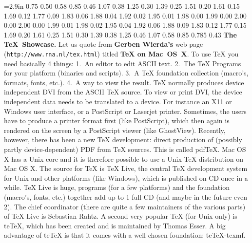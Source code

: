 
\nopagenumbers {}=2.9in \parindent0pt
  0.75   0.50
  0.58   0.85
  0.46   1.07
  0.38   1.25
  0.30   1.39
  0.25   1.51
  0.20   1.61
  0.15   1.69
  0.12   1.77
  0.09   1.83
  0.06   1.88
  0.04   1.92
  0.02   1.95
  0.01   1.98
  0.00   1.99
  0.00   2.00
  0.00   2.00
  0.00   1.99
  0.01   1.98
  0.02   1.95
  0.04   1.92
  0.06   1.88
  0.09   1.83
  0.12   1.77
  0.15   1.69
  0.20   1.61
  0.25   1.51
  0.30   1.39
  0.38   1.25
  0.46   1.07
  0.58   0.85
  0.785   0.43
\baselineskip=12.5pt
\parfillskip=0pt
{\bf The \TeX\ Showcase.}
Let us quote from {\bf Gerben Wierda's} web page
({\tt http://www.rna.nl/tex.html}) titled
{\bf TeX on Mac~OS~X}.
To use TeX you need basically 4 things:
1.~An editor to edit ASCII text. 
2.~The TeX Programs for your platform (binaries and scripts). 
3.~A TeX foundation collection (macro's, formats, fonts, etc.). 
4.~A way to view the result.
%
TeX normally produces device independent DVI from the ASCII TeX source. 
To view or print DVI, the device independent data needs to be translated to a device. For instance an X11 or Windows user interface, or a PostScript or Laserjet printer. Sometimes, the users have to produce a printer format first (like PostScript), which then again is rendered on the screen by a PostScript viewer (like GhostView).
Recently, however, there has been a new TeX development: direct production of (possibly partly device-dependent) PDF from TeX sources. This is called pdfTeX.
Mac OS X has a Unix core and it is therefore possible to use a Unix TeX distribution on Mac OS X. The source for TeX is TeX Live, the central TeX development system for Unix and other platforms (like Windows), which is published on CD once in a while. TeX Live is huge, programs (for a few platforms) and the foundation (macro's, fonts, etc.) together add up to 1 full CD (and maybe in the future even 2). The chief coordinator (there are quite a few maintainers of the various parts) of TeX Live is Sebastian Rahtz. A second very popular TeX (for Unix only) is teTeX, which has been created and is maintained by Thomas Esser. A big advantage of teTeX is that it comes with a well chosen foundation: teTeX-texmf.
